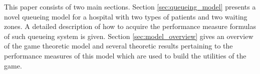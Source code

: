 This paper consists of two main sections.
Section \ref{sec:queueing_model} presents a novel queueing model for a hospital
with two types of patients and two waiting zones.
A detailed description of how to acquire the performance measure formulas of 
such queueing system is given.
Section \ref{sec:model_overview} gives an overview of the game theoretic model
and several
theoretic results pertaining to the performance measures of this model which 
are used to build the utilities of the game.